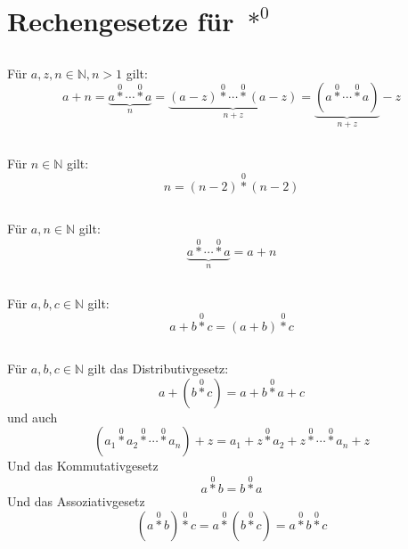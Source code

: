 \documentclass{article}
\begin{document}
\section{Rechengesetze f\"ur $\operatorname*{\ast}^0$\newline}

\subsection{}
F\"ur $a, z, n \in \mathbb{N}, n > 1$ gilt:
\[ a + n = \underbrace{a \operatorname*{\ast}^0 \dotsb \operatorname*{\ast}^0 a}_n =
   \underbrace{\left(a - z\right) \operatorname*{\ast}^0 \dotsb \operatorname*{\ast}^0 \left(a - z\right)}_{n+z} =
   \underbrace{\left(a \operatorname*{\ast}^0 \dotsb \operatorname*{\ast}^0 a\right)}_{n+z} - z \]
\subsection{}
F\"ur $n \in \mathbb{N}$ gilt:
\[ n = \left(n-2\right)\operatorname*{\ast}^{0}\left(n-2\right) \]
\subsection{}
F\"ur $a, n \in \mathbb{N}$ gilt:
\[ \underbrace{a \operatorname*{\ast}^0 \dotsb \operatorname*{\ast}^0 a}_n = a+n \]
\subsection{}
F\"ur $a, b, c \in \mathbb{N}$ gilt:
\[ a+b\operatorname*{\ast}^0c = \left(a+b\right)\operatorname*{\ast}^0 c \]
\subsection{}
F\"ur $a, b, c \in \mathbb{N}$ gilt das Distributivgesetz:
\[ a+\left(b\operatorname*{\ast}^0c\right) = a + b \operatorname*{\ast}^0 a + c \]
und auch
\[ \left( a_1 \operatorname*{\ast}^0 a_2 \operatorname*{\ast}^0 \dotsb \operatorname*{\ast}^0 a_n \right) + z =
         a_1 + z \operatorname*{\ast}^0 a_2 + z \operatorname*{\ast}^0 \dotsb \operatorname*{\ast}^0 a_n +z \]
Und das Kommutativgesetz
\[ a \operatorname*{\ast}^0 b = b \operatorname*{\ast}^0 a \]
Und das Assoziativgesetz
\[ \left( a \operatorname*{\ast}^0 b \right) \operatorname*{\ast}^0 c = a \operatorname*{\ast}^0 \left( b \operatorname*{\ast}^0 c \right) =
   a \operatorname*{\ast}^0 b \operatorname*{\ast}^0 c \]
\end{document}
